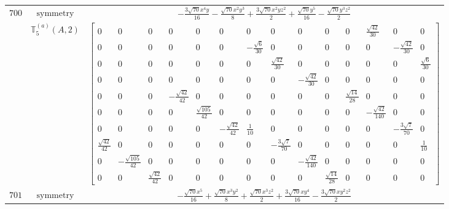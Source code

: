 \documentclass[fleqn,8pt,landscape]{jsarticle}
\begin{document}
\begin{longtable}{ccc}
$ 700 $ & $ \text{symmetry} $ & $ - \frac{3 \sqrt{70} x^{4} y}{16} - \frac{\sqrt{70} x^{2} y^{3}}{8} + \frac{3 \sqrt{70} x^{2} y z^{2}}{2} + \frac{\sqrt{70} y^{5}}{16} - \frac{\sqrt{70} y^{3} z^{2}}{2} $ \\
$  $ & $ \mathbb{T}_{5}^{(a)}(A,2) $ & $ \begin{bmatrix} 0 & 0 & 0 & 0 & 0 & 0 & 0 & 0 & 0 & 0 & 0 & \frac{\sqrt{42}}{30} & 0 & 0 \\ 0 & 0 & 0 & 0 & 0 & 0 & - \frac{\sqrt{6}}{30} & 0 & 0 & 0 & 0 & 0 & - \frac{\sqrt{42}}{30} & 0 \\ 0 & 0 & 0 & 0 & 0 & 0 & 0 & \frac{\sqrt{42}}{30} & 0 & 0 & 0 & 0 & 0 & \frac{\sqrt{6}}{30} \\ 0 & 0 & 0 & 0 & 0 & 0 & 0 & 0 & - \frac{\sqrt{42}}{30} & 0 & 0 & 0 & 0 & 0 \\ 0 & 0 & 0 & - \frac{\sqrt{42}}{42} & 0 & 0 & 0 & 0 & 0 & 0 & \frac{\sqrt{14}}{28} & 0 & 0 & 0 \\ 0 & 0 & 0 & 0 & \frac{\sqrt{105}}{42} & 0 & 0 & 0 & 0 & 0 & 0 & - \frac{\sqrt{42}}{140} & 0 & 0 \\ 0 & 0 & 0 & 0 & 0 & - \frac{\sqrt{42}}{42} & \frac{1}{10} & 0 & 0 & 0 & 0 & 0 & - \frac{3 \sqrt{7}}{70} & 0 \\ \frac{\sqrt{42}}{42} & 0 & 0 & 0 & 0 & 0 & 0 & - \frac{3 \sqrt{7}}{70} & 0 & 0 & 0 & 0 & 0 & \frac{1}{10} \\ 0 & - \frac{\sqrt{105}}{42} & 0 & 0 & 0 & 0 & 0 & 0 & - \frac{\sqrt{42}}{140} & 0 & 0 & 0 & 0 & 0 \\ 0 & 0 & \frac{\sqrt{42}}{42} & 0 & 0 & 0 & 0 & 0 & 0 & \frac{\sqrt{14}}{28} & 0 & 0 & 0 & 0 \end{bmatrix} $ \\ \hline
$ 701 $ & $ \text{symmetry} $ & $ - \frac{\sqrt{70} x^{5}}{16} + \frac{\sqrt{70} x^{3} y^{2}}{8} + \frac{\sqrt{70} x^{3} z^{2}}{2} + \frac{3 \sqrt{70} x y^{4}}{16} - \frac{3 \sqrt{70} x y^{2} z^{2}}{2} $ \\

\end{longtable}
\end{document}

